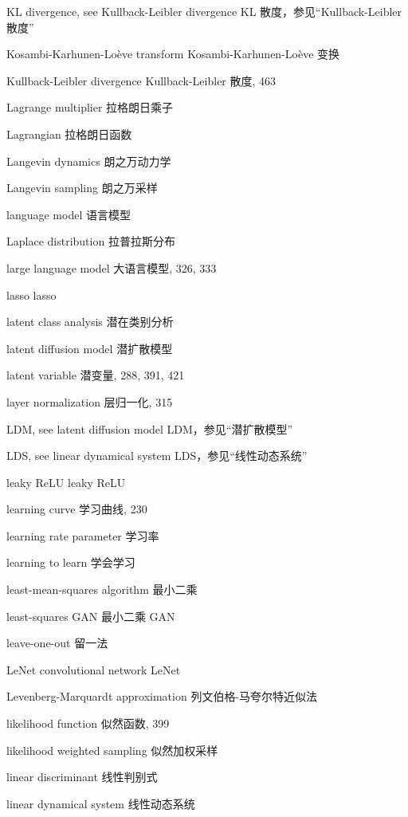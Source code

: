 KL divergence, see Kullback-Leibler divergence KL 散度，参见“Kullback-Leibler 散度”\par
Kosambi-Karhunen-Loève transform Kosambi-Karhunen-Loève 变换\par
Kullback-Leibler divergence Kullback-Leibler 散度, 463\par
Lagrange multiplier 拉格朗日乘子\par
Lagrangian 拉格朗日函数\par
Langevin dynamics 朗之万动力学\par
Langevin sampling 朗之万采样\par
language model 语言模型\par
Laplace distribution 拉普拉斯分布\par
large language model 大语言模型, 326, 333\par
lasso lasso\par
latent class analysis 潜在类别分析\par
latent diffusion model 潜扩散模型\par
latent variable 潜变量, 288, 391, 421\par
layer normalization 层归一化, 315\par
LDM, see latent diffusion model LDM，参见“潜扩散模型”\par
LDS, see linear dynamical system LDS，参见“线性动态系统”\par
leaky ReLU leaky ReLU\par
learning curve 学习曲线, 230\par
learning rate parameter 学习率\par
learning to learn 学会学习\par
least-mean-squares algorithm 最小二乘\par
least-squares GAN 最小二乘 GAN\par
leave-one-out 留一法\par
LeNet convolutional network LeNet\par
Levenberg-Marquardt approximation 列文伯格-马夸尔特近似法\par
likelihood function 似然函数, 399\par
likelihood weighted sampling 似然加权采样\par
linear discriminant 线性判别式\par
linear dynamical system 线性动态系统\par
